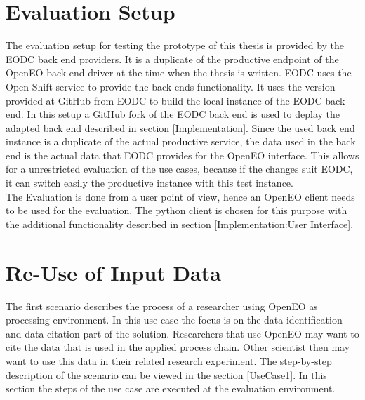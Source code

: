 \documentclass[draft,final]{vutinfth} %
\begin{document}
 \section{Evaluation Setup}\label{Evaluation:Setup}
The evaluation setup for testing the prototype of this thesis is provided by the EODC back end providers. It is a duplicate of the productive endpoint of the OpenEO back end driver at the time when the thesis is written. EODC uses the Open Shift service to provide the back ends functionality. It uses the version provided at GitHub from EODC to build the local instance of the EODC back end. In this setup a GitHub fork of the EODC back end is used to deplay the adapted back end described in section \ref{Implementation}. Since the used back end instance is a duplicate of the actual productive service, the data used in the back end is the actual data that EODC provides for the OpenEO interface. This allows for a unrestricted evaluation of the use cases, because if the changes suit EODC, it can switch easily the productive instance with this test instance. \\
The Evaluation is done from a user point of view, hence an OpenEO client needs to be used for the evaluation. The python client is chosen for this purpose with the additional functionality described in section \ref{Implementation:User Interface}. \\ 


\section{Re-Use of Input Data}\label{Evaluation:Use Cases}\label{Evaluation:Use Case1}
The first scenario describes the process of a researcher using OpenEO as processing environment. In this use case the focus is on the data identification and data citation part of the solution. Researchers that use OpenEO may want to cite the data that is used in the applied process chain. Other scientist then may want to use this data in their related research experiment. The step-by-step description of the scenario can be viewed in the section \ref{UseCase1}. In this section the steps of the use case are executed at the evaluation environment.
\end{document}
